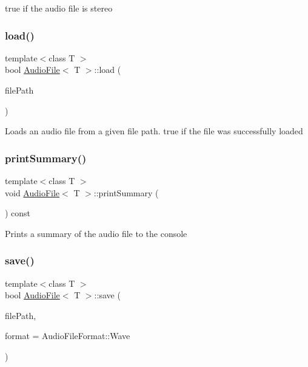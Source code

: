 true if the audio file is stereo \mbox{\label{class_audio_file_a0ff16123b519a4665e9f3e7d341f0a26}} 
\subsubsection{\texorpdfstring{load()}{load()}}
{\footnotesize\ttfamily template$<$class T $>$ \\
bool \hyperlink{class_audio_file}{Audio\+File}$<$ T $>$\+::load (\begin{DoxyParamCaption}\item[{std\+::string}]{file\+Path }\end{DoxyParamCaption})}

Loads an audio file from a given file path.  true if the file was successfully loaded \mbox{\label{class_audio_file_a7b88c68133a9ac92149c58499e026360}} 
\subsubsection{\texorpdfstring{print\+Summary()}{printSummary()}}
{\footnotesize\ttfamily template$<$class T $>$ \\
void \hyperlink{class_audio_file}{Audio\+File}$<$ T $>$\+::print\+Summary (\begin{DoxyParamCaption}{ }\end{DoxyParamCaption}) const}

Prints a summary of the audio file to the console \mbox{\label{class_audio_file_a415239cad5b54b4fef4a210ab79911e3}} 
\subsubsection{\texorpdfstring{save()}{save()}}
{\footnotesize\ttfamily template$<$class T $>$ \\
bool \hyperlink{class_audio_file}{Audio\+File}$<$ T $>$\+::save (\begin{DoxyParamCaption}\item[{std\+::string}]{file\+Path,  }\item[{\hyperlink{_audio_file_8h_ad18559d169602e85d0ad68da6ef8593f}{Audio\+File\+Format}}]{format = {\ttfamily AudioFileFormat\+:\+:Wave} }\end{DoxyParamCaption})}

